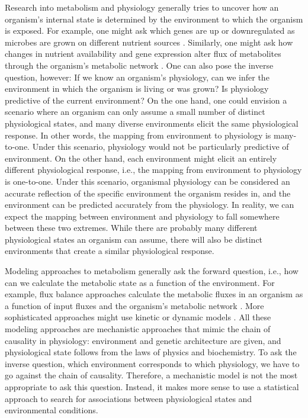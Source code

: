 \documentclass[12pt]{article}
\begin{document}
Research into metabolism and physiology generally tries to uncover how an organism's internal state is determined by the environment to which the organism is exposed. For example, one might ask which genes are up or downregulated as microbes are grown on different nutrient sources \cite{Taoetal1999,Huaetal2004,Wuetal2004}. Similarly, one might ask how changes in nutrient availability and gene expression alter flux of metabolites through the organism's metabolic network \cite{FischerSauer2003,Leeetal2009,Boeretal2010,HaverkornvanRijsewijketal2011}. One can also pose the inverse question, however: If we know an organism's physiology, can we infer the environment in which the organism is living or was grown? Is physiology predictive of the current environment? On the one hand, one could envision a scenario where an organism can only assume a small number of distinct physiological states, and many diverse environments elicit the same physiological response. In other words, the mapping from environment to physiology is many-to-one. Under this scenario, physiology would not be particularly predictive of environment. On the other hand, each environment might elicit an entirely different physiological response, i.e., the mapping from environment to physiology is one-to-one. Under this scenario, organismal physiology can be considered an accurate reflection of the specific environment the organism resides in, and the environment can be predicted accurately from the physiology. In reality, we can expect the mapping between environment and physiology to fall somewhere between these two extremes. While there are probably many different physiological states an organism can assume, there will also be distinct environments that create a similar physiological response.

Modeling approaches to metabolism generally ask the forward question, i.e., how can we calculate the metabolic state as a function of the environment. For example, flux balance approaches calculate the metabolic fluxes in an organism as a function of input fluxes and the organism's metabolic network \cite{Segreetal2002,Feistetal2007,SnitkinSegre2008,Orthetal2010}. More sophisticated approaches might use kinetic or dynamic models \cite{Covertetal2008,Adadietal2012}. All these modeling approaches are mechanistic approaches that mimic the chain of causality in physiology: environment and genetic architecture are given, and physiological state follows from the laws of physics and biochemistry. To ask the inverse question, which environment corresponds to which physiology, we have to go against the chain of causality. Therefore, a mechanistic model is not the most appropriate to ask this question. Instead, it makes more sense to use a statistical approach to search for associations between physiological states and environmental conditions.
\end{document}
